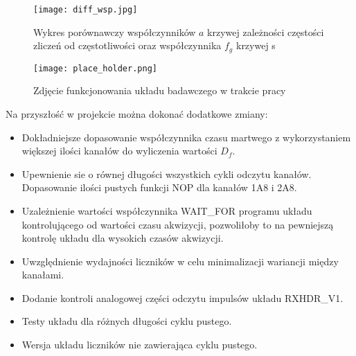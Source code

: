\begin{figure}
        \begin{multicols}{2}
            \texttt{[image: diff\_wsp.jpg]}
            \caption{Wykres porównawczy współczynników $a$ krzywej zależności częstości zliczeń od częstotliwości oraz współczynnika $f_g$ krzywej s}
            \label{wyk wsp diff}  \hfill \par
            \texttt{[image: place\_holder.png]}
            \caption{Zdjęcie funkcjonowania układu badawczego w trakcie pracy}
            \label{pic koniec} \par
            
        \end{multicols}
\end{figure}

Na przyszłość w projekcie można dokonać dodatkowe zmiany:
\begin{itemize}
        \item Dokładniejsze dopasowanie współczynnika czasu martwego z wykorzystaniem większej ilości kanałów do wyliczenia wartości $D_f$.
        \item Upewnienie sie o równej długości wszystkich cykli odczytu kanałów. Dopasowanie ilości pustych funkcji NOP dla kanałów 1A8 i 2A8.
        \item Uzależnienie wartości współczynnika WAIT\_FOR programu układu kontrolującego od wartości czasu akwizycji, pozwoliłoby to na pewniejszą kontrolę układu dla wysokich czasów akwizycji. 
        \item Uwzględnienie wydajności liczników w celu minimalizacji wariancji między kanałami. 
        \item Dodanie kontroli analogowej części odczytu impulsów układu RXHDR\_V1.
        \item Testy układu dla różnych długości cyklu pustego. 
        \item Wersja układu liczników nie zawierająca cyklu pustego. 
\end{itemize}


\newpage
\begin{appendix}
        \listoffigures
        \listoftables
      \end{appendix}
\newpage


